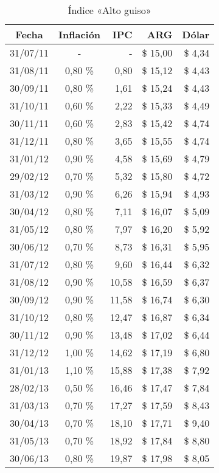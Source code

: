 \begin{longtable}{|c|c|r|r|r|}
\caption{Índice «Alto guiso»}
\label{tab:cotizacion-altoguiso}\\
\hline
\textbf{Fecha} & \textbf{Inflación} & \textbf{IPC} & \textbf{ARG} & \textbf{Dólar} \\ \hline
31/07/11 & - & - & \$ 15,00 & \$ 4,34 \\ \hline
31/08/11 & 0,80 \% & 0,80 & \$ 15,12 & \$ 4,43 \\ \hline
30/09/11 & 0,80 \% & 1,61 & \$ 15,24 & \$ 4,43 \\ \hline
31/10/11 & 0,60 \% & 2,22 & \$ 15,33 & \$ 4,49 \\ \hline
30/11/11 & 0,60 \% & 2,83 & \$ 15,42 & \$ 4,74 \\ \hline
31/12/11 & 0,80 \% & 3,65 & \$ 15,55 & \$ 4,74 \\ \hline
31/01/12 & 0,90 \% & 4,58 & \$ 15,69 & \$ 4,79 \\ \hline
29/02/12 & 0,70 \% & 5,32 & \$ 15,80 & \$ 4,72 \\ \hline
31/03/12 & 0,90 \% & 6,26 & \$ 15,94 & \$ 4,93 \\ \hline
30/04/12 & 0,80 \% & 7,11 & \$ 16,07 & \$ 5,09 \\ \hline
31/05/12 & 0,80 \% & 7,97 & \$ 16,20 & \$ 5,92 \\ \hline
30/06/12 & 0,70 \% & 8,73 & \$ 16,31 & \$ 5,95 \\ \hline
31/07/12 & 0,80 \% & 9,60 & \$ 16,44 & \$ 6,32 \\ \hline
31/08/12 & 0,90 \% & 10,58 & \$ 16,59 & \$ 6,37 \\ \hline
30/09/12 & 0,90 \% & 11,58 & \$ 16,74 & \$ 6,30 \\ \hline
31/10/12 & 0,80 \% & 12,47 & \$ 16,87 & \$ 6,34 \\ \hline
30/11/12 & 0,90 \% & 13,48 & \$ 17,02 & \$ 6,44 \\ \hline
31/12/12 & 1,00 \% & 14,62 & \$ 17,19 & \$ 6,80 \\ \hline
31/01/13 & 1,10 \% & 15,88 & \$ 17,38 & \$ 7,92 \\ \hline
28/02/13 & 0,50 \% & 16,46 & \$ 17,47 & \$ 7,84 \\ \hline
31/03/13 & 0,70 \% & 17,27 & \$ 17,59 & \$ 8,43 \\ \hline
30/04/13 & 0,70 \% & 18,10 & \$ 17,71 & \$ 9,40 \\ \hline
31/05/13 & 0,70 \% & 18,92 & \$ 17,84 & \$ 8,80 \\ \hline
30/06/13 & 0,80 \% & 19,87 & \$ 17,98 & \$ 8,05 \\ \hline

\end{longtable}
